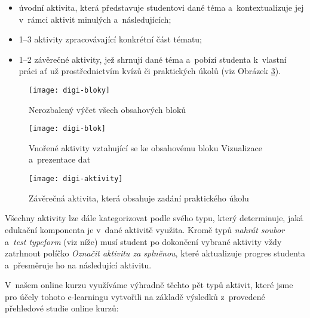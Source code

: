 \begin{itemize}
\tightlist
\item
  úvodní aktivita, která představuje studentovi dané téma a~kontextualizuje jej v~rámci aktivit minulých a~následujících;
\item
  1--3 aktivity zpracovávající konkrétní část tématu;
\item
  1--2 závěrečné aktivity, jež shrnují dané téma a~pobízí studenta k~vlastní práci ať už prostřednictvím kvízů či praktických úkolů (viz Obrázek \ref{digi-aktivity}).
\end{itemize}

\begin{figure}[ht]   
    \centering
    \texttt{[image: digi-bloky]}  
    \caption{Nerozbalený výčet všech obsahových bloků}
    \label{digi-bloky}
\end{figure}

\begin{figure}[ht]   
    \centering
    \texttt{[image: digi-blok]}  
    \caption{Vnořené aktivity vztahující se ke obsahovému bloku Vizualizace a~prezentace dat}
    \label{digi-blok}
\end{figure}

\begin{figure}[ht]   
    \centering
    \texttt{[image: digi-aktivity]}  
    \caption{Závěrečná aktivita, která obsahuje zadání praktického úkolu}
    \label{digi-aktivity}
\end{figure}

Všechny aktivity lze dále kategorizovat podle svého typu, který determinuje, jaká edukační komponenta je v~dané aktivitě využita. Kromě typů \emph{nahrát soubor} a~\emph{test typeform} (viz níže) musí student po dokončení vybrané aktivity vždy zatrhnout políčko \emph{Označit aktivitu za splněnou}, které aktualizuje progres studenta a~přesměruje ho na následující aktivitu.

V~našem online kurzu využíváme výhradně těchto pět typů aktivit, které jsme pro účely tohoto e-learningu vytvořili na základě výsledků z~provedené přehledové studie online kurzů:

